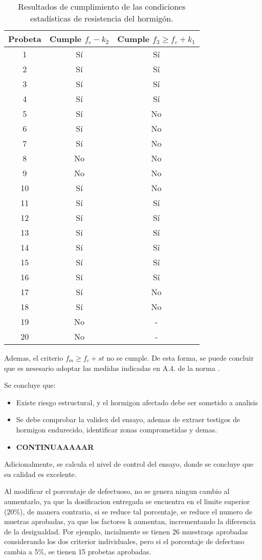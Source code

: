 \begin{table}[H]
\centering
\begin{tabular}{|c|c|c|}
\hline
\textbf{Probeta} & \textbf{Cumple $f_c - k_2$} & \textbf{Cumple $f_3 \geq f_c + k_1$} \\ \hline
1  & Sí & Sí \\ \hline
2  & Sí & Sí \\ \hline
3  & Sí & Sí \\ \hline
4  & Sí & Sí \\ \hline
5  & Sí & No \\ \hline
6  & Sí & No \\ \hline
7  & Sí & No \\ \hline
8  & No & No \\ \hline
9  & No & No \\ \hline
10 & Sí & No \\ \hline
11 & Sí & Sí \\ \hline
12 & Sí & Sí \\ \hline
13 & Sí & Sí \\ \hline
14 & Sí & Sí \\ \hline
15 & Sí & Sí \\ \hline
16 & Sí & Sí \\ \hline
17 & Sí & No \\ \hline
18 & Sí & No \\ \hline
19 & No & - \\ \hline
20 & No & - \\ \hline
\end{tabular}
\caption{Resultados de cumplimiento de las condiciones estadísticas de resistencia del hormigón.}
\label{tab:cumplimiento}
\end{table}

Ademas, el criterio $f_m \geq f_c + st$ no se cumple. De esta forma, se puede concluir que es nesesario adoptar las medidas indicadas en A.4. de la norma \cite{NCh1998}.

Se concluye que:

\begin{itemize}
    \item Existe riesgo estructural, y el hormigon afectado debe ser sometido a analisis
    \item Se debe comprobar la validex del ensayo, ademas de extraer testigos de hormigon endurecido, identificar zonas comprometidas y demas.
    \item \textbf{CONTINUAAAAAR}
\end{itemize}

Adicionalmente, se calcula el nivel de control del ensayo, donde se concluye que su calidad es excelente.

Al modificar el porcentaje de defectuoso, no se genera ningun cambio al aumentarlo, ya que la dosificacion entregada se encuentra en el limite superior (20\%), de manera contraria, si se reduce tal porcentaje, se reduce el numero de muetras aprobadas, ya que los factores k aumentan, incrementando la diferencia de la desigualdad. Por ejemplo, incialmente se tienen 26 muestraqs aprobadas considerando los dos criterior individuales, pero si el porcentaje de defectuso cambia a 5\%, se tienen 15 probetas aprobadas.